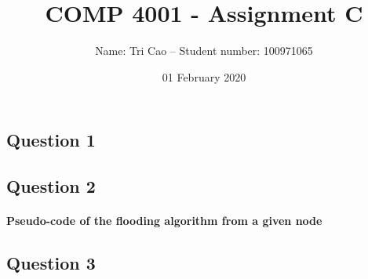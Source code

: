 \documentclass[12pt,english,]{article}
\title{\Huge\textbf{COMP 4001 - Assignment C}}
\subtitle{Name: Tri Cao -- Student number: 100971065}
\author{}
\date{01 February 2020}
\let\oldparagraph\paragraph
\renewcommand{\paragraph}[1]{\oldparagraph{#1}\mbox{}}
\begin{document}
\maketitle


\hypertarget{question-1}{%
\subsection{Question 1}\label{question-1}}

\hypertarget{question-2}{%
\subsection{Question 2}\label{question-2}}

\hypertarget{pseudo-code-of-the-flooding-algorithm-from-a-given-node}{%
\paragraph{Pseudo-code of the flooding algorithm from a given
node}\label{pseudo-code-of-the-flooding-algorithm-from-a-given-node}}

\hypertarget{question-3}{%
\subsection{Question 3}\label{question-3}}
\end{document}
